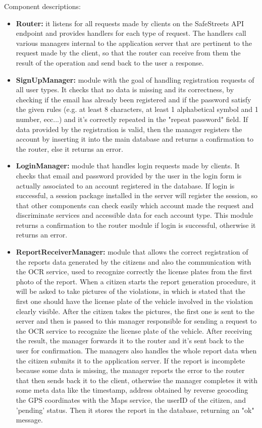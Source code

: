 \bigskip
Component descriptions:
\begin{itemize}
	\item \textbf{Router:} 
	it listens for all requests made by clients on the SafeStreets API endpoint and provides handlers for each type of request. The handlers call various managers internal to the application server that are pertinent to the request made by the client, so that the router can receive from them the result of the operation and send back to the user a response.
	\item \textbf{SignUpManager:}
	module with the goal of handling registration requests of all user types. It checks that no data is missing and its correctness, by checking if the email has already been registered and if the password satisfy the given rules (e.g. at least 8 characters, at least 1 alphabetical symbol and 1 number, ecc...) and it's correctly repeated in the "repeat password" field. If data provided by the registration is valid, then the manager registers the account by inserting it into the main database and returns a confirmation to the router, else it returns an error.
	\item \textbf{LoginManager:}
	module that handles login requests made by clients. It checks that email and password provided by the user in the login form is actually associated to an account registered in the database. If login is successful, a session package installed in the server will register the session, so that other components can check easily which account made the request and discriminate services and accessible data for each account type. This module returns a confirmation to the router module if login is successful, otherwise it returns an error.
	\item \textbf{ReportReceiverManager:}
	module that allows the correct registration of the reports data generated by the citizens and also the communication with the OCR service, used to recognize correctly the license plates from the first photo of the report. When a citizen starts the report generation procedure, it will be asked to take pictures of the violations, in which is stated that the first one should have the license plate of the vehicle involved in the violation clearly visible. After the citizen takes the pictures, the first one is sent to the server and then is passed to this manager responsible for sending a request to the OCR service to recognize the license plate of the vehicle. After receiving the result, the manager forwards it to the router and it's sent back to the user for confirmation. The managers also handles the whole report data when the citizen submits it to the application server. If the report is incomplete because some data is missing, the manager reports the error to the router that then sends back it to the client, otherwise the manager completes it with some meta data like the timestamp, address obtained by reverse geocoding the GPS coordinates with the Maps service, the userID of the citizen, and 'pending' status. Then it stores the report in the database, returning an "ok" message.

\end{itemize}
